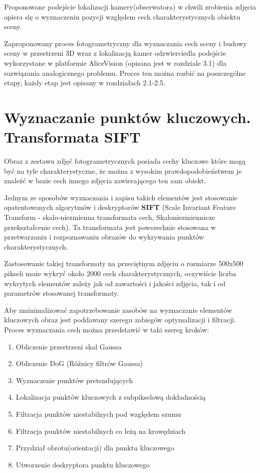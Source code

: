 Proponowane podejście lokalizacji kamery(obserwatora) w chwili zrobienia zdjęcia opiera się o wyznaczeniu pozycji względem cech charakterystycznych obiektu sceny.

Zaproponowany proces fotogrametryczny dla wyznaczania cech sceny i budowy sceny w przestrzeni 3D wraz z lokalizacją kamer odzwierciedla podejście wykorzystane w platformie AliceVision (opisana jest w rozdziale 3.1) dla rozwiązania analogicznego problemu. Proces ten można rozbić na poszczególne etapy, każdy etap jest opisany w rozdziałach 2.1-2.5.

\section{Wyznaczanie punktów kluczowych. Transformata SIFT}
Obraz z zestawu zdjęć fotogrametrycznych posiada cechy kluczowe które mogą być na tyle charakterystyczne, że można z wysokim prawdopodobieństwem je znaleźć w bazie cech innego zdjęcia zawierającego ten sam obiekt.

Jednym ze sposobów wyznaczania i zapisu takich elementów jest stosowanie opatentowanych algorytmów i deskryptorów \textbf{SIFT} (Scale Invariant Feature Transform - skalo-niezmienna transformata cech, Skaloniezmiennicze przekształcenie cech). Ta transformata jest powszechnie stosowana w przetwarzaniu i rozpoznawaniu obrazów do wykrywania punktów charakterystycznych.

Zastosowanie takiej transformaty na przeciętnym zdjęciu o rozmiarze 500x500 pikseli może wykryć około 2000 cech charakterystycznych, oczywiście liczba wykrytych elementów zależy jak od zawartości i jakości zdjęcia, tak i od parametrów stosowanej transformaty.

Aby zminimalizować zapotrzebowanie zasobów na wyznaczanie elementów kluczowych obraz jest poddawany szeregu zabiegów optymalizacji i filtracji. Proces wyznaczania cech można przedstawić w taki szereg kroków:
\begin{enumerate}
   \item Obliczenie przestrzeni skal Gaussa
   \item Obliczenie DoG (Róźnicy filtrów Gaussa)
   \item Wyznaczenie punktów pretendujących
   \item Lokalizacja punktów kluczowych z subpikselową dokładnością
   \item Filtracja punktów niestabilnych pod względem szumu
   \item Filtracja punktów niestabilnych co leżą na krawędziach
   \item Przydział obrotu(orientacji) dla punktu kluczowego
   \item Utworzenie deskryptora punktu kluczowego
\end{enumerate}

